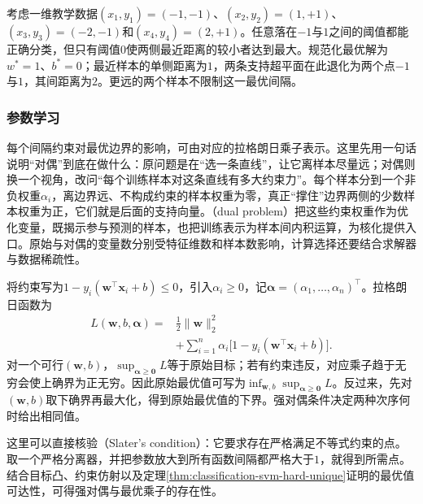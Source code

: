 \begin{example}[单侧间隔与带宽]
  \label{ex:classification-svm-one-dimensional}
  考虑一维教学数据$(x_1,y_1)=(-1,-1)$、$(x_2,y_2)=(1,+1)$、$(x_3,y_3)=(-2,-1)$和$(x_4,y_4)=(2,+1)$。任意落在$-1$与$1$之间的阈值都能正确分类，但只有阈值$0$使两侧最近距离的较小者达到最大。规范化最优解为$w^{\ast}=1$、$b^{\ast}=0$；最近样本的单侧距离为$1$，两条支持超平面在此退化为两个点$-1$与$1$，其间距离为$2$。更远的两个样本不限制这一最优间隔。
\end{example}

\subsubsection{参数学习}
\label{sec:classification-svm-learning}

每个间隔约束对最优边界的影响，可由对应的拉格朗日乘子表示。这里先用一句话说明“对偶”到底在做什么：原问题是在“选一条直线”，让它离样本尽量远；对偶则换一个视角，改问“每个训练样本对这条直线有多大约束力”。每个样本分到一个非负权重$\alpha_i$，离边界远、不构成约束的样本权重为零，真正“撑住”边界两侧的少数样本权重为正，它们就是后面的支持向量。（dual problem）把这些约束权重作为优化变量，既揭示参与预测的样本，也把训练表示为样本间内积运算，为核化提供入口。原始与对偶的变量数分别受特征维数和样本数影响，计算选择还要结合求解器与数据稀疏性。

将约束写为$1-y_i(\bm{w}^{\top}\bm{x}_i+b)\le0$，引入$\alpha_i\ge0$，记$\bm{\alpha}=(\alpha_1,\ldots,\alpha_n)^{\top}$。拉格朗日函数为
\begin{equation}
  \begin{aligned}
    L(\bm{w},b,\bm{\alpha})
    ={}&\frac12\lVert\bm{w}\rVert_2^2\\
      &+\sum_{i=1}^n\alpha_i
        \bigl[1-y_i(\bm{w}^{\top}\bm{x}_i+b)\bigr].
  \end{aligned}
  \label{eq:classification-svm-hard-lagrangian}
\end{equation}
对一个可行$(\bm{w},b)$，$\sup_{\bm{\alpha}\ge\bm{0}}L$等于原始目标；若有约束违反，对应乘子趋于无穷会使上确界为正无穷。因此原始最优值可写为$\inf_{\bm{w},b}\sup_{\bm{\alpha}\ge\bm{0}}L$。反过来，先对$(\bm{w},b)$取下确界再最大化，得到原始最优值的下界。强对偶条件决定两种次序何时给出相同值。

这里可以直接核验（Slater's condition）：它要求存在严格满足不等式约束的点。取一个严格分离器，并把参数放大到所有函数间隔都严格大于$1$，就得到所需点。结合目标凸、约束仿射以及定理\ref{thm:classification-svm-hard-unique}证明的最优值可达性，可得强对偶与最优乘子的存在性。

